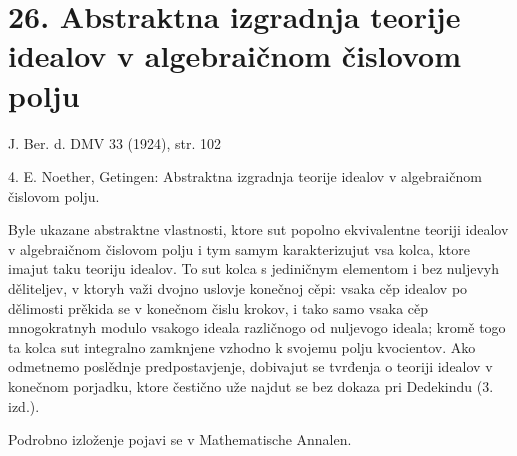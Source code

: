 \documentclass[11pt]{article}
\begin{document}
\section*{26. Abstraktna izgradnja teorije idealov v algebraičnom čislovom polju}

\begin{center}
J. Ber. d. DMV 33 (1924), str. 102
\end{center}

4. E. Noether, Getingen: Abstraktna izgradnja teorije idealov v algebraičnom čislovom polju.

Byle ukazane abstraktne vlastnosti, ktore sut popolno ekvivalentne teoriji idealov v algebraičnom čislovom polju i tym samym karakterizujut vsa kolca, ktore imajut taku teoriju idealov. To sut kolca s jediničnym elementom i bez nuljevyh děliteljev, v ktoryh važi dvojno uslovje konečnoj cěpi: vsaka cěp idealov po dělimosti prěkida se v konečnom čislu krokov, i tako samo vsaka cěp mnogokratnyh modulo vsakogo ideala različnogo od nuljevogo ideala; kromě togo ta kolca sut integralno zamknjene vzhodno k svojemu polju kvocientov. Ako odmetnemo poslědnje predpostavjenje, dobivajut se tvrđenja o teoriji idealov v konečnom porjadku, ktore čestično uže najdut se bez dokaza pri Dedekindu (3. izd.).

Podrobno izloženje pojavi se v Mathematische Annalen.
\end{document}
